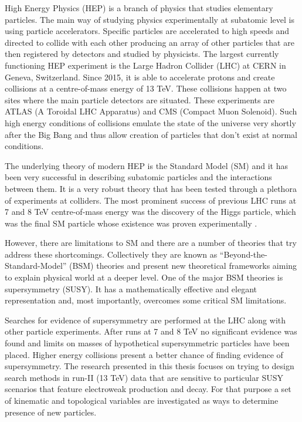 High Energy Physics (HEP) is a branch of physics that studies elementary particles. The main way of studying physics experimentally at subatomic level is using particle accelerators. Specific particles are accelerated to high speeds and directed to collide with each other producing an array of other particles that are then registered by detectors and studied by physicists. The largest currently functioning HEP experiment is the Large Hadron Collider (LHC) at CERN in Geneva, Switzerland. Since 2015, it is able to accelerate protons and create collisions at a centre-of-mass energy of 13 TeV. These collisions happen at two sites where the main particle detectors are situated. These experiments are ATLAS (A Toroidal LHC Apparatus) and CMS (Compact Muon Solenoid). Such high energy conditions of collisions emulate the state of the universe very shortly after the Big Bang and thus allow creation of particles that don't exist at normal conditions. 

The underlying theory of modern HEP is the Standard Model (SM) and it has been very successful in describing subatomic particles and the interactions between them. It is a very robust theory that has been tested through a plethora of experiments at colliders. The most prominent success of previous LHC runs at 7 and 8 TeV centre-of-mass energy was the discovery of the Higgs particle, which 
was the final SM particle whose existence was proven experimentally \citep{Aad:2012tfa,chatrchyan2012observation}.   

However, there are limitations to SM and there are a number of theories that try address these shortcomings. Collectively they are known as “Beyond-the-Standard-Model” (BSM) theories and present new theoretical frameworks aiming to explain physical world at a deeper level. One of the major BSM theories is supersymmetry (SUSY). It has a mathematically effective and elegant representation and, most importantly, overcomes some critical SM limitations.

Searches for evidence of supersymmetry are performed at the LHC along with other particle experiments. After runs at 7 and 8 TeV no significant evidence was found and limits on masses of hypothetical supersymmetric particles have been placed. Higher energy collisions present a better chance of finding  evidence of supersymmetry. The research presented in this thesis focuses on trying to design search methods in run-II (13 TeV) data that are sensitive to particular SUSY scenarios that feature electroweak production and decay. For that purpose a set of kinematic and topological variables are investigated as ways to determine presence of new particles.
